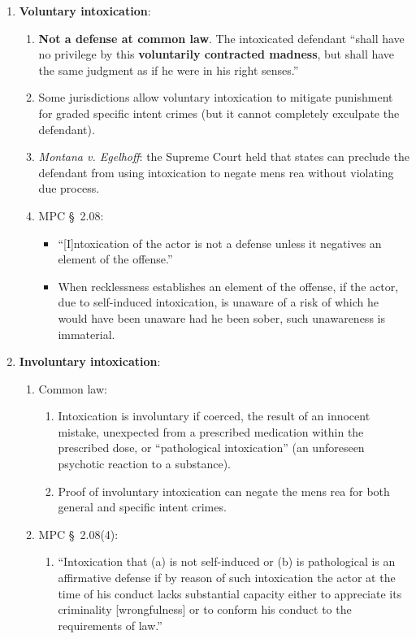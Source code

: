 \begin{enumerate}
    \item \textbf{Voluntary intoxication}:
        \begin{enumerate}
            \item \textbf{Not a defense at common law}. The intoxicated 
            defendant ``shall have no privilege by this \textbf{voluntarily 
            contracted madness}, but shall have the same judgment as if he 
            were in his right senses.''
            \item Some jurisdictions allow voluntary intoxication to mitigate 
            punishment for graded specific intent crimes (but it cannot 
            completely exculpate the defendant).
            \item \emph{Montana v. Egelhoff}: the Supreme Court held that 
            states can preclude the defendant from using intoxication to 
            negate mens rea without violating due process.
            \item MPC \S\ 2.08:
            \begin{itemize}
                \item ``[I]ntoxication of the actor is not a defense unless it 
                negatives an element of the offense.''
                \item When recklessness establishes an element of the offense, if the 
                actor, due to self-induced intoxication, is unaware of a risk of which 
                he would have been unaware had he been sober, such unawareness is 
                immaterial.
            \end{itemize}
        \end{enumerate}
    \item \textbf{Involuntary intoxication}:
    \begin{enumerate}
        \item Common law:
        \begin{enumerate}
            \item Intoxication is involuntary if coerced, the result of an 
            innocent mistake, unexpected from a prescribed medication within 
            the prescribed dose, or ``pathological intoxication'' (an 
            unforeseen psychotic reaction to a substance). 
            \item Proof of involuntary intoxication can negate the mens rea 
            for both general and specific intent crimes.
        \end{enumerate}
        \item MPC \S\ 2.08(4):
        \begin{enumerate}
            \item ``Intoxication that (a) is not self-induced or (b) is 
            pathological is an affirmative defense if by reason of such 
            intoxication the actor at the time of his conduct lacks 
            substantial capacity either to appreciate its criminality 
            [wrongfulness] or to conform his conduct to the requirements of 
            law.''
        \end{enumerate}
    \end{enumerate}
\end{enumerate}

